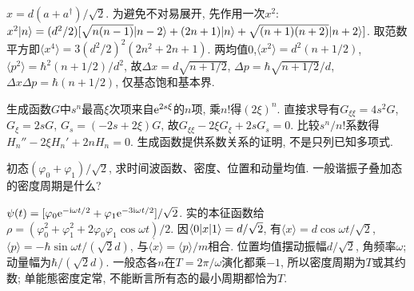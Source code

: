 \begin{solution}
$x=d(a+a^\dagger)/\sqrt2$. 为避免不对易展开, 先作用一次$x^2$:
$x^2\lvert n\rangle=(d^2/2)[\sqrt{n(n-1)}\lvert n-2\rangle+(2n+1)\lvert n\rangle+\sqrt{(n+1)(n+2)}\lvert n+2\rangle]$. 取范数平方即$\langle x^4\rangle=3(d^2/2)^2(2n^2+2n+1)$. 两均值0,$\langle x^2\rangle=d^2(n+1/2)$,$\langle p^2\rangle=\hbar^2(n+1/2)/d^2$, 故$\Delta x=d\sqrt{n+1/2}$, $\Delta p=\hbar\sqrt{n+1/2}/d$, $\Delta x\Delta p=\hbar(n+1/2)$, 仅基态饱和基本界.

生成函数$G$中$s^n$最高$\xi$次项来自$\mathrm e^{2s\xi}$的$n$项, 乘$n!$得$(2\xi)^n$. 直接求导有$G_{\xi\xi}=4s^2G$, $G_\xi=2sG$, $G_s=(-2s+2\xi)G$, 故$G_{\xi\xi}-2\xi G_\xi+2sG_s=0$. 比较$s^n/n!$系数得$H_n''-2\xi H_n'+2nH_n=0$. 生成函数提供系数关系的证明, 不是只列已知多项式.
\end{solution}
\begin{exercise}
初态$(\varphi_0+\varphi_1)/\sqrt2$, 求时间波函数、密度、位置和动量均值. 一般谐振子叠加态的密度周期是什么?
\end{exercise}
\begin{solution}
$\psi(t)=[\varphi_0\mathrm e^{-\mathrm i\omega t/2}+\varphi_1\mathrm e^{-3\mathrm i\omega t/2}]/\sqrt2$. 实的本征函数给$\rho=(\varphi_0^2+\varphi_1^2+2\varphi_0\varphi_1\cos\omega t)/2$. 因$\langle 0\rvert x\lvert 1\rangle=d/\sqrt2$, 有$\langle x\rangle=d\cos\omega t/\sqrt2$, $\langle p\rangle=-\hbar\sin\omega t/(\sqrt2d)$, 与$\dot{\langle x\rangle}=\langle p\rangle/m$相合. 位置均值摆动振幅$d/\sqrt2$, 角频率$\omega$; 动量幅为$\hbar/(\sqrt2d)$. 一般态各$n$在$T=2\pi/\omega$演化都乘$-1$, 所以密度周期为$T$或其约数; 单能態密度定常, 不能断言所有态的最小周期都恰为$T$.
\end{solution}
